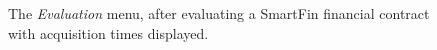 \begin{figure}[h]
    \centering
    \caption{The \textit{Evaluation} menu, after evaluating a SmartFin financial contract with acquisition times displayed.}
    \label{UG:fig:eval-scale-obs-evaluated-times}
\end{figure}